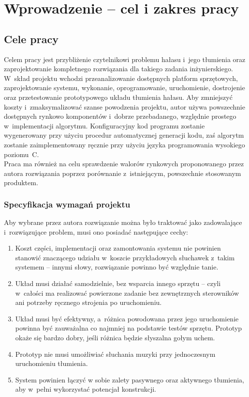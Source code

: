 \chapter{Wprowadzenie -- cel i zakres pracy}
\label{cha:intro}

\section{Cele pracy}
\label{sec:celePracy}
Celem pracy jest przybliżenie czytelnikowi problemu hałasu i~jego tłumienia oraz  zaprojektowanie kompletnego rozwiązania dla takiego zadania inżynierskiego. W~skład projektu wchodzi przeanalizowanie dostępnych platform sprzętowych, zaprojektowanie systemu, wykonanie, oprogramowanie, uruchomienie, dostrojenie oraz przetestowanie prototypowego układu tłumienia hałasu. Aby zmniejszyć koszty i~zmaksymalizować szanse powodzenia projektu, autor używa powszechnie dostępnych rynkowo komponentów i~dobrze przebadanego, względnie prostego w~implementacji algorytmu. Konfiguracyjny kod programu zostanie wygenerowany przy użyciu procedur automatycznej generacji kodu, zaś algorytm zostanie zaimplementowany ręcznie przy użyciu języka programowania wysokiego poziomu~C.\\
Praca ma również na celu sprawdzenie walorów rynkowych proponowanego przez autora rozwiązania poprzez porównanie z~istniejącym, powszechnie stosowanym produktem.
\subsection{Specyfikacja wymagań projektu}
Aby wybrane przez autora rozwiązanie można było traktować jako zadowalające i~rozwiązujące problem, musi ono posiadać następujące cechy:
\begin{enumerate}
	\item Koszt części, implementacji oraz zamontowania systemu nie powinien stanowić znaczącego udziału w~koszcie przykładowych słuchawek z~takim systemem -- innymi słowy, rozwiązanie powinno być względnie tanie.
	\item Układ musi działać samodzielnie, bez wsparcia innego sprzętu -- czyli w~całości ma realizować powierzone zadanie bez zewnętrznych sterowników ani potrzeby ręcznego strojenia po uruchomieniu.
	\item Układ musi być efektywny, a~różnica powodowana przez jego uruchomienie powinna być zauważalna co najmniej na podstawie testów sprzętu. Prototyp okaże się bardzo dobry, jeśli różnica będzie słyszalna gołym uchem.
	\item Prototyp nie musi umożliwiać słuchania muzyki przy jednoczesnym uruchomieniu tłumienia.
	\item System powinien łączyć w sobie zalety pasywnego oraz aktywnego tłumienia, aby w~pełni wykorzystać potencjał konstrukcji.
\end{enumerate}
